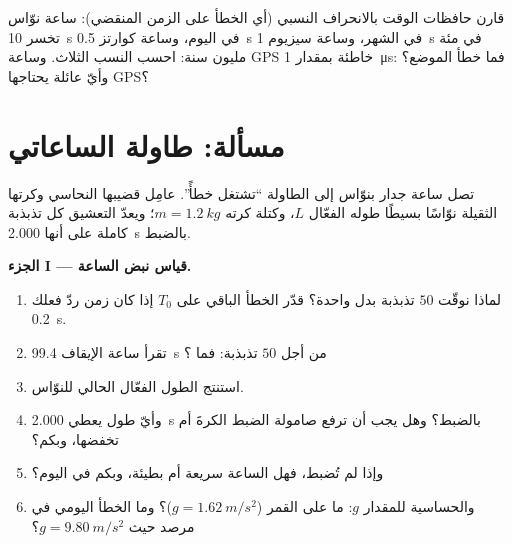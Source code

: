 \begin{exercise}[$\star\star\star$]\label{exo:g12:oscillators-and-time:15}
قارن حافظات الوقت بالانحراف النسبي (أي الخطأ على الزمن المنقضي):
ساعة نوّاس تخسر \qty{10}{s} في اليوم، وساعة كوارتز
\qty{0.5}{s} في الشهر، وساعة سيزيوم \qty{1}{s} في مئة مليون
سنة: احسب النسب الثلاث. وساعة GPS خاطئة بمقدار
\qty{1}{\micro s}: فما خطأ الموضع؟ وأيّ عائلة يحتاجها GPS؟
\end{exercise}

\section{مسألة: طاولة الساعاتي}

\begin{problem}
\label{pb:g12:oscillators-and-time:1}
تصل ساعة جدار بنوّاس إلى الطاولة ``تشتغل خطأً''. عامِل
قضيبها النحاسي وكرتها الثقيلة نوّاسًا بسيطًا طوله الفعّال
$L$، وكتلة كرته $m = \qty{1.2}{kg}$؛ ويعدّ التعشيق كل
تذبذبة كاملة على أنها \qty{2.000}{s} بالضبط.

\medskip
\noindent\textbf{الجزء I --- قياس نبض الساعة.}
\begin{enumerate}
  \item لماذا نوقّت $50$ تذبذبة بدل واحدة؟ قدّر الخطأ
        الباقي على $T_0$ إذا كان زمن ردّ فعلك \qty{0.2}{s}.
  \item تقرأ ساعة الإيقاف \qty{99.4}{s} من أجل $50$ تذبذبة: فما ؟
  \item استنتج الطول الفعّال الحالي للنوّاس.
  \item وأيّ طول يعطي \qty{2.000}{s} بالضبط؟ وهل يجب أن ترفع
        صامولة الضبط الكرةَ أم تخفضها، وبكم؟
  \item وإذا لم تُضبط، فهل الساعة سريعة أم بطيئة، وبكم  في اليوم؟
  \item والحساسية للمقدار $g$: ما  على القمر
        ($g = \qty{1.62}{m/s^2}$)؟ وما الخطأ اليومي في مرصد
        حيث $g = \qty{9.80}{m/s^2}$؟
\end{enumerate}


\end{problem}
